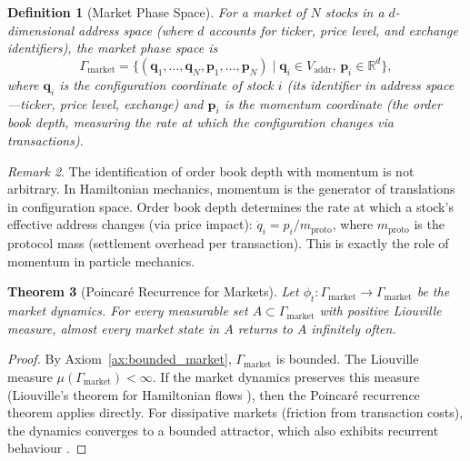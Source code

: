 \documentclass[twocolumn,10pt]{article}
\newtheorem{theorem}{Theorem}[section]
\newtheorem{definition}[theorem]{Definition}
\theoremstyle{remark}
\newtheorem{remark}[theorem]{Remark}
\newcommand{\Vaddr}{V_{\mathrm{addr}}}
\newcommand{\mproto}{m_{\mathrm{proto}}}
\begin{document}
\begin{definition}[Market Phase Space]
\label{def:market_phase_space}
For a market of $N$ stocks in a $d$-dimensional address space (where $d$ accounts for ticker, price level, and exchange identifiers), the \emph{market phase space} is
\begin{equation}
    \Gamma_{\mathrm{market}} = \{(\mathbf{q}_1, \ldots, \mathbf{q}_N, \mathbf{p}_1, \ldots, \mathbf{p}_N) \mid \mathbf{q}_i \in \Vaddr, \, \mathbf{p}_i \in \mathbb{R}^d\},
    \label{eq:market_phase_space}
\end{equation}
where $\mathbf{q}_i$ is the \emph{configuration coordinate} of stock $i$ (its identifier in address space---ticker, price level, exchange) and $\mathbf{p}_i$ is the \emph{momentum coordinate} (the order book depth, measuring the rate at which the configuration changes via transactions).
\end{definition}

\begin{remark}
The identification of order book depth with momentum is not arbitrary.  In Hamiltonian mechanics, momentum is the generator of translations in configuration space.  Order book depth determines the rate at which a stock's effective address changes (via price impact): $\dot{q}_i = p_i / \mproto$, where $\mproto$ is the protocol mass (settlement overhead per transaction).  This is exactly the role of momentum in particle mechanics.
\end{remark}

\begin{theorem}[Poincar\'{e} Recurrence for Markets]
\label{thm:market_recurrence}
Let $\phi_t : \Gamma_{\mathrm{market}} \to \Gamma_{\mathrm{market}}$ be the market dynamics.  For every measurable set $A \subset \Gamma_{\mathrm{market}}$ with positive Liouville measure, almost every market state in $A$ returns to $A$ infinitely often.
\end{theorem}

\begin{proof}
By Axiom~\ref{ax:bounded_market}, $\Gamma_{\mathrm{market}}$ is bounded.  The Liouville measure $\mu(\Gamma_{\mathrm{market}}) < \infty$.  If the market dynamics preserves this measure (Liouville's theorem for Hamiltonian flows \cite{arnold1978,goldstein2002}), then the Poincar\'{e} recurrence theorem \cite{poincare1890} applies directly.  For dissipative markets (friction from transaction costs), the dynamics converges to a bounded attractor, which also exhibits recurrent behaviour \cite{strogatz2000}.
\end{proof}
\end{document}
